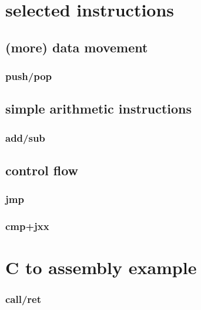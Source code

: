 


\section{selected instructions}

\subsection{(more) data movement}

\subsubsection{push/pop}



\subsection{simple arithmetic instructions}

\subsubsection{add/sub}



\subsection{control flow}

\subsubsection{jmp}



\subsubsection{cmp+jxx}



\section{C to assembly example}



\subsubsection{call/ret}

